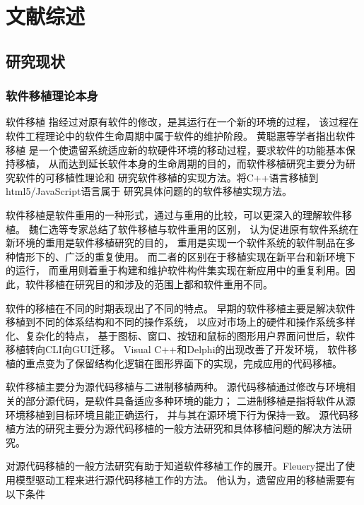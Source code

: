 \chapter{文献综述}

\section{研究现状}

\subsection{软件移植理论本身}

软件移植
指经过对原有软件的修改，是其运行在一个新的环境的过程，
该过程在软件工程理论中的软件生命周期中属于软件的维护阶段。
黄聪惠等学者指出软件移植
是一个使遗留系统适应新的软硬件环境的移动过程，要求软件的功能基本保持移植，
从而达到延长软件本身的生命周期的目的，而软件移植研究主要分为研究软件的可移植性理论和
研究软件移植的实现方法。将C++语言移植到html5/JavaScript语言属于
研究具体问题的的软件移植实现方法。

软件移植是软件重用的一种形式，通过与重用的比较，可以更深入的理解软件移植。
魏仁选等专家总结了软件移植与软件重用的区别，
认为促进原有软件系统在新环境的重用是软件移植研究的目的，
重用是实现一个软件系统的软件制品在多种情形下的、广泛的重复使用。
而二者的区别在于移植实现在新平台和新环境下的运行，
而重用则着重于构建和维护软件构件集实现在新应用中的重复利用。因此，软件移植在研究目的和涉及的范围上都和软件重用不同。

软件的移植在不同的时期表现出了不同的特点。
早期的软件移植主要是解决软件移植到不同的体系结构和不同的操作系统，
以应对市场上的硬件和操作系统多样化、复杂化的特点，
基于图标、窗口、按钮和鼠标的图形用户界面问世后，软件移植转向CLI向GUI迁移。
Visual C++和Delphi的出现改善了开发环境，
软件移植的重点变为了保留结构化逻辑在图形界面下的实现，完成应用的代码移植。

软件移植主要分为源代码移植与二进制移植两种。
源代码移植通过修改与环境相关的部分源代码，是软件具备适应多种环境的能力；
二进制移植是指将软件从源环境移植到目标环境且能正确运行，
并与其在源环境下行为保持一致。
源代码移植方法的研究主要分为源代码移植的一般方法研究和具体移植问题的解决方法研究。

对源代码移植的一般方法研究有助于知道软件移植工作的展开。Fleuery提出了使用模型驱动工程来进行源代码移植工作的方法。
他认为，遗留应用的移植需要有以下条件

